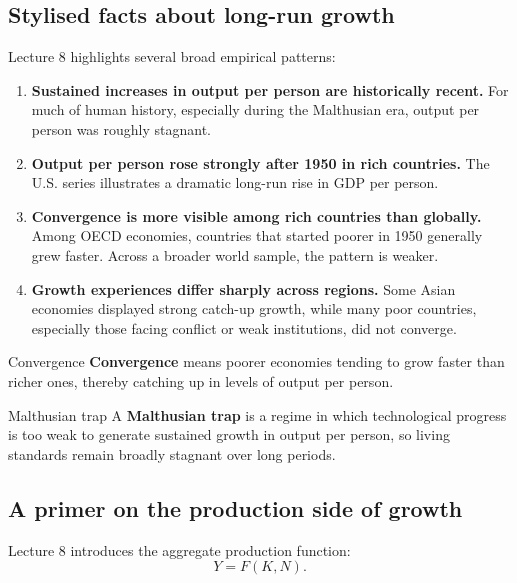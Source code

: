 \documentclass[12pt]{article}
\begin{document}
\subsection{Stylised facts about long-run growth}

Lecture 8 highlights several broad empirical patterns:

\begin{enumerate}[leftmargin=1.5em]
\item \textbf{Sustained increases in output per person are historically recent.}
For much of human history, especially during the Malthusian era, output per person was roughly stagnant.

\item \textbf{Output per person rose strongly after 1950 in rich countries.}
The U.S. series illustrates a dramatic long-run rise in GDP per person.

\item \textbf{Convergence is more visible among rich countries than globally.}
Among OECD economies, countries that started poorer in 1950 generally grew faster. Across a broader world sample, the pattern is weaker.

\item \textbf{Growth experiences differ sharply across regions.}
Some Asian economies displayed strong catch-up growth, while many poor countries, especially those facing conflict or weak institutions, did not converge.
\end{enumerate}

\begin{definition}{Convergence}{}
\textbf{Convergence} means poorer economies tending to grow faster than richer ones, thereby catching up in levels of output per person.
\end{definition}

\begin{definition}{Malthusian trap}{}
A \textbf{Malthusian trap} is a regime in which technological progress is too weak to generate sustained growth in output per person, so living standards remain broadly stagnant over long periods.
\end{definition}

\subsection{A primer on the production side of growth}

Lecture 8 introduces the aggregate production function:
\[
Y=F(K,N).
\]
\end{document}
